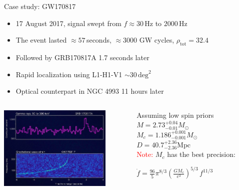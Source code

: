 \documentclass[xcolor=dvipsnames,handout,t]{beamer}
\newcommand{\red}[1]{\textcolor{red}{#1}}
\newcommand{\f}{\frac}
\begin{document}
\begin{frame}{Case study: GW170817}
\begin{itemize}
  \item 17 August 2017, signal swept from $f\approx 30\,$Hz to $2000\,$Hz 
  \item The event lasted $\approx 57\,$seconds, $\approx 3000$ GW cycles, $\rho_\text{tot} = 32.4$
  \item Followed by GRB170817A 1.7 seconds later
  \item Rapid localization using L1-H1-V1 $\sim 30\,\text{deg}^2$
  \item Optical counterpart in NGC 4993 11 hours later
\end{itemize}  

  \begin{columns}
  \begin{column}{0.5\textwidth}  %
      \begin{center}
      \includegraphics[height=4cm]{figs/GW_GRB170817.jpg}
      \end{center}
  \end{column}
  \begin{column}{0.5\textwidth}
    Assuming low spin priors\\
    $ M=2.73^{+0.04}_{-0.01} M_\odot$ \\
    $ M_c =1.186^{+0.001}_{-0.001}M_\odot $ \\ 
    $ D=40.7^{+2.36}_{-2.36}\text{Mpc} $ \\
    \red{Note:} $M_c$ has the best precision: 
  \begin{small}${\dot{f}} = \f{96}{5}\pi^{8/3} \left(\tfrac{G M_c}{c^3}\right)^{5/3}\, {f^{11/3}}$ \end{small}
    
    \end{column}
  \end{columns} 
  
  

\end{frame}
\end{document}
